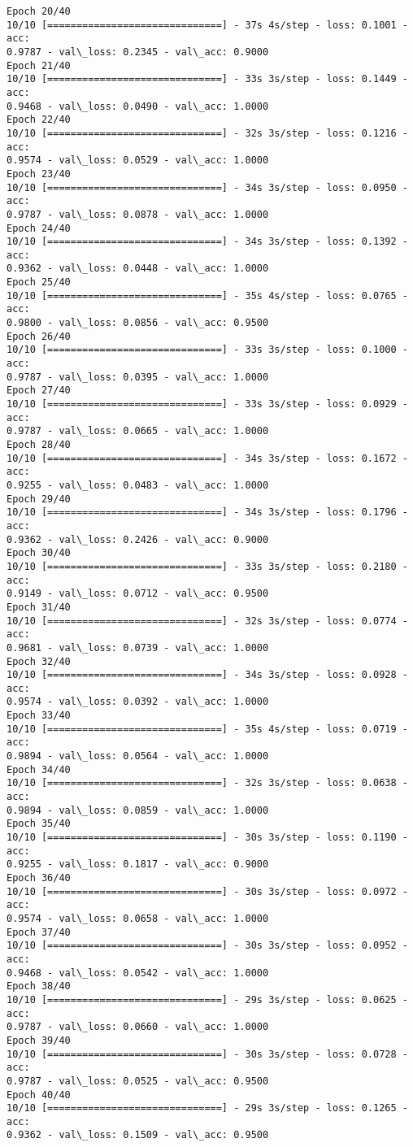 \documentclass[11pt]{article}
\begin{document}
\begin{Verbatim}[commandchars=\\\{\}]
Epoch 20/40
10/10 [==============================] - 37s 4s/step - loss: 0.1001 - acc:
0.9787 - val\_loss: 0.2345 - val\_acc: 0.9000
Epoch 21/40
10/10 [==============================] - 33s 3s/step - loss: 0.1449 - acc:
0.9468 - val\_loss: 0.0490 - val\_acc: 1.0000
Epoch 22/40
10/10 [==============================] - 32s 3s/step - loss: 0.1216 - acc:
0.9574 - val\_loss: 0.0529 - val\_acc: 1.0000
Epoch 23/40
10/10 [==============================] - 34s 3s/step - loss: 0.0950 - acc:
0.9787 - val\_loss: 0.0878 - val\_acc: 1.0000
Epoch 24/40
10/10 [==============================] - 34s 3s/step - loss: 0.1392 - acc:
0.9362 - val\_loss: 0.0448 - val\_acc: 1.0000
Epoch 25/40
10/10 [==============================] - 35s 4s/step - loss: 0.0765 - acc:
0.9800 - val\_loss: 0.0856 - val\_acc: 0.9500
Epoch 26/40
10/10 [==============================] - 33s 3s/step - loss: 0.1000 - acc:
0.9787 - val\_loss: 0.0395 - val\_acc: 1.0000
Epoch 27/40
10/10 [==============================] - 33s 3s/step - loss: 0.0929 - acc:
0.9787 - val\_loss: 0.0665 - val\_acc: 1.0000
Epoch 28/40
10/10 [==============================] - 34s 3s/step - loss: 0.1672 - acc:
0.9255 - val\_loss: 0.0483 - val\_acc: 1.0000
Epoch 29/40
10/10 [==============================] - 34s 3s/step - loss: 0.1796 - acc:
0.9362 - val\_loss: 0.2426 - val\_acc: 0.9000
Epoch 30/40
10/10 [==============================] - 33s 3s/step - loss: 0.2180 - acc:
0.9149 - val\_loss: 0.0712 - val\_acc: 0.9500
Epoch 31/40
10/10 [==============================] - 32s 3s/step - loss: 0.0774 - acc:
0.9681 - val\_loss: 0.0739 - val\_acc: 1.0000
Epoch 32/40
10/10 [==============================] - 34s 3s/step - loss: 0.0928 - acc:
0.9574 - val\_loss: 0.0392 - val\_acc: 1.0000
Epoch 33/40
10/10 [==============================] - 35s 4s/step - loss: 0.0719 - acc:
0.9894 - val\_loss: 0.0564 - val\_acc: 1.0000
Epoch 34/40
10/10 [==============================] - 32s 3s/step - loss: 0.0638 - acc:
0.9894 - val\_loss: 0.0859 - val\_acc: 1.0000
Epoch 35/40
10/10 [==============================] - 30s 3s/step - loss: 0.1190 - acc:
0.9255 - val\_loss: 0.1817 - val\_acc: 0.9000
Epoch 36/40
10/10 [==============================] - 30s 3s/step - loss: 0.0972 - acc:
0.9574 - val\_loss: 0.0658 - val\_acc: 1.0000
Epoch 37/40
10/10 [==============================] - 30s 3s/step - loss: 0.0952 - acc:
0.9468 - val\_loss: 0.0542 - val\_acc: 1.0000
Epoch 38/40
10/10 [==============================] - 29s 3s/step - loss: 0.0625 - acc:
0.9787 - val\_loss: 0.0660 - val\_acc: 1.0000
Epoch 39/40
10/10 [==============================] - 30s 3s/step - loss: 0.0728 - acc:
0.9787 - val\_loss: 0.0525 - val\_acc: 0.9500
Epoch 40/40
10/10 [==============================] - 29s 3s/step - loss: 0.1265 - acc:
0.9362 - val\_loss: 0.1509 - val\_acc: 0.9500
    \end{Verbatim}
\end{document}
